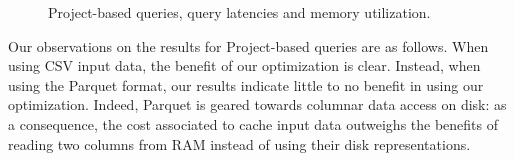 \begin{figure}[!htb]
	\centering



   \caption{Project-based queries, query latencies and memory utilization.}
   \label{fig:query2}
\end{figure}

Our observations on the results for Project-based queries are as follows. 
When using CSV input data, the benefit of our optimization is clear. Instead, when using the Parquet format, our results indicate little to no benefit in using our optimization. Indeed, Parquet is geared towards columnar data access on disk: as a consequence, the cost associated to cache input data outweighs the benefits of reading two columns from RAM instead of using their disk representations.

